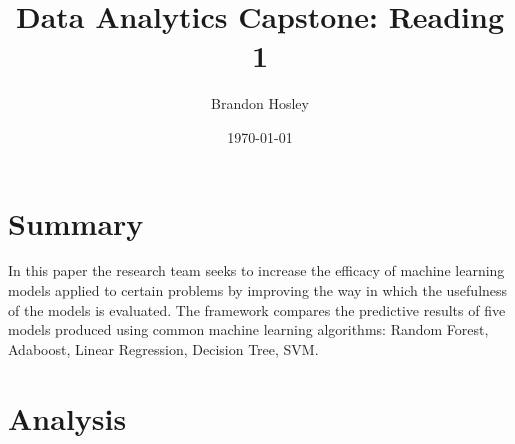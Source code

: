 \documentclass[]{article}
\title{Data Analytics Capstone: Reading 1}
\author{Brandon Hosley}
\date{\today}
\begin{document}
	\maketitle
	
\section{Summary} 

In this paper \cite{Lakkaraju2015} the research team seeks to increase the efficacy of machine learning models applied to certain problems by improving the way in which the usefulness of the models is evaluated. 
The framework compares the predictive results of five models produced using common machine learning algorithms: Random Forest, Adaboost, Linear Regression, Decision Tree, SVM.


\section{Analysis}




\clearpage


\end{document}
